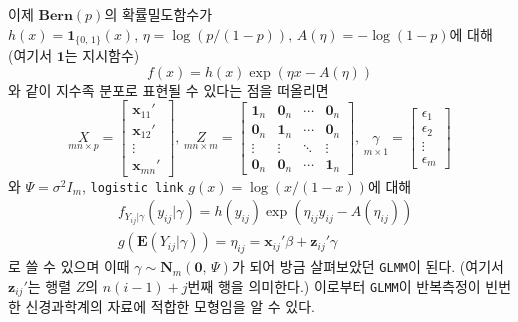 \documentclass[10pt,onecolumn,twoside,a4size]{gsag3jnl}
\begin{document}
이제 $\mathbf{Bern}(p)$의 확률밀도함수가 $h(x)=\mathbf{1}_{\{0,\,1\}}(x),\,\eta=\log(p/(1-p)),\,A(\eta)=-\log(1-p)$에 대해 (여기서 $\mathbf{1}$는 지시함수)
\begin{equation}
  f(x)=h(x)\exp(\eta x-A(\eta))
\end{equation}
와 같이 지수족 분포로 표현될 수 있다는 점을 떠올리면
\begin{equation}
  \underset{mn\times p}{X}=\begin{bmatrix*}
    \mathbf{x}_{11}'\\
    \mathbf{x}_{12}'\\
    \vdots\\
    \mathbf{x}_{mn}'
  \end{bmatrix*},\,\underset{mn\times m}{Z}=\begin{bmatrix*}
    \mathbf{1}_n&\mathbf{0}_n&\cdots&\mathbf{0}_n\\
    \mathbf{0}_n&\mathbf{1}_n&\cdots&\mathbf{0}_n\\
    \vdots&\vdots&\ddots&\vdots\\
    \mathbf{0}_n&\mathbf{0}_n&\cdots&\mathbf{1}_n
  \end{bmatrix*},\,\underset{m\times1}{\gamma}=\begin{bmatrix*}
    \epsilon_1\\
    \epsilon_2\\
    \vdots\\
    \epsilon_m
  \end{bmatrix*}
\end{equation}
와 $\Psi=\sigma^2I_m$, \texttt{logistic link} $g(x)=\log(x/(1-x))$에 대해
\begin{align}
  &f_{Y_{ij}\vert\gamma}(y_{ij}\vert\gamma)=h(y_{ij})\exp(\eta_{ij}y_{ij}-A(\eta_{ij}))\\
  &g(\mathbf{E}(Y_{ij}\vert\gamma))=\eta_{ij}=\mathbf{x}_{ij}'\beta+\mathbf{z}_{ij}'\gamma\nonumber
\end{align}
로 쓸 수 있으며 이때 $\gamma\sim\mathbf{N}_{m}(\mathbf{0},\,\Psi)$가 되어 방금 살펴보았던 \texttt{GLMM}이 된다. (여기서 $\mathbf{z}_{ij}'$는 행렬 $Z$의 $n(i-1)+j$번째 행을 의미한다.) 이로부터 \texttt{GLMM}이 반복측정이 빈번한 신경과학계의 자료에 적합한 모형임을 알 수 있다.
\end{document}
